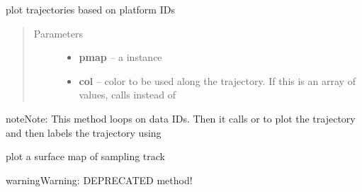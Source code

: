 \documentclass[letterpaper,10pt,english]{sphinxmanual}
\begin{document}
\begin{fulllineitems}
\begin{fulllineitems}
\end{fulllineitems}


\begin{fulllineitems}
\label{altimetry.data:altimetry.data.hydro_data.plot_track}
plot trajectories based on platform IDs
\begin{quote}\begin{description}
\item[{Parameters}] \leavevmode\begin{itemize}
\item {} 
\textbf{pmap} -- a  instance

\item {} 
\textbf{col} -- color to be used along the trajectory. If this is an array of values, calls  instead of 

\end{itemize}

\end{description}\end{quote}

\begin{notice}{note}{Note:}
This method loops on data IDs. Then it calls  or  to plot the trajectory and then labels the trajectory using 
\end{notice}

\end{fulllineitems}


\begin{fulllineitems}
\label{altimetry.data:altimetry.data.hydro_data.plot_track_old}
plot a surface map of sampling track

\begin{notice}{warning}{Warning:}
DEPRECATED method!
\end{notice}


\end{fulllineitems}
\end{fulllineitems}
\end{document}

